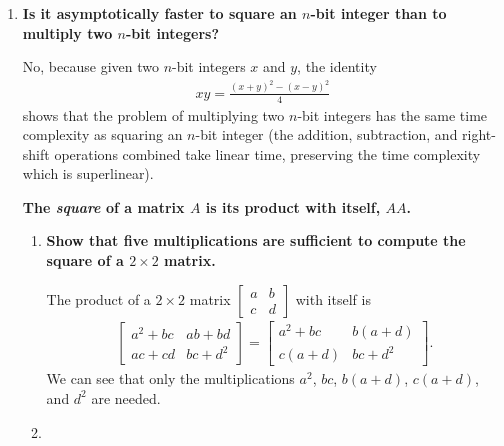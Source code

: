 \documentclass[a4paper,12pt]{article}
\begin{document}
\begin{enumerate}
    \item
        \boldmath\textbf{Is it asymptotically faster to square an $n$-bit integer than to multiply two $n$-bit integers?
        }\unboldmath \par
        No, because given two $n$-bit integers $x$ and $y$, the identity
        \begin{align*}
            xy = \frac{(x + y)^2 - (x - y)^2}{4}
        \end{align*}
        shows that the problem of multiplying two $n$-bit integers has the same time complexity as squaring an $n$-bit integer (the addition, subtraction, and right-shift operations combined take linear time, preserving the time complexity which is superlinear). \par
        \boldmath\textbf{The \emph{square} of a matrix $A$ is its product with itself, $AA$.
        }\unboldmath
            \begin{enumerate}
                \item
                    \boldmath\textbf{Show that five multiplications are sufficient to compute the square of a $2 \times 2$ matrix.
                    }\unboldmath \par
                    The product of a $2 \times 2$ matrix $
                        \left[ \begin{array}{cc}
                                a & b \\
                                c & d
                        \end{array} \right]
                    $ with itself is
                    \begin{align*}
                        \left[ \begin{array}{cc}
                                a^2 + bc & ab + bd \\
                                ac + cd & bc + d^2
                        \end{array} \right]
                        = \left[ \begin{array}{cc}
                                a^2 + bc & b(a + d) \\
                                c(a + d) & bc + d^2
                        \end{array} \right].
                    \end{align*}
                    We can see that only the multiplications $a^2$, $bc$, $b(a + d)$, $c(a + d)$, and $d^2$ are needed.
                \item

\end{enumerate}
\end{enumerate}
\end{document}
